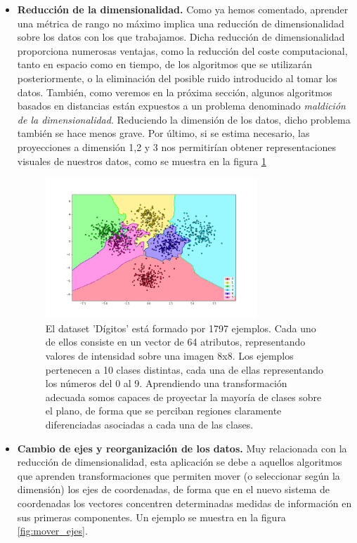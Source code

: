\documentclass{book}
\begin{document}
\begin{itemize}
	\item \textbf{Reducción de la dimensionalidad.} Como ya hemos comentado, aprender una métrica de rango no máximo implica una reducción de dimensionalidad sobre los datos con los que trabajamos. Dicha reducción de dimensionalidad proporciona numerosas ventajas, como la reducción del coste computacional, tanto en espacio como en tiempo, de los algoritmos que se utilizarán posteriormente, o la eliminación del posible ruido introducido al tomar los datos. También, como veremos en la próxima sección, algunos algoritmos basados en distancias están expuestos a un problema denominado \emph{maldición de la dimensionalidad}. Reduciendo la dimensión de los datos, dicho problema también se hace menos grave. Por último, si se estima necesario, las proyecciones a dimensión 1,2 y 3 nos permitirían obtener representaciones visuales de nuestros datos, como se muestra en la figura \ref{fig:reduc_dim}

	\begin{figure}[h]
	\centering
	\includegraphics[width=0.75\textwidth]{./images/ex_red_dim.png}
	\caption{El dataset 'Dígitos' está formado por 1797 ejemplos. Cada uno de ellos consiste en un vector de 64 atributos, representando valores de intensidad sobre una imagen 8x8. Los ejemplos pertenecen a 10 clases distintas, cada una de ellas representando los números del 0 al 9. Aprendiendo una transformación adecuada somos capaces de proyectar la mayoría de clases sobre el plano, de forma que se perciban regiones claramente diferenciadas asociadas a cada una de las clases.} \label{fig:reduc_dim}
	\end{figure}


	\item \textbf{Cambio de ejes y reorganización de los datos.} Muy relacionada con la reducción de dimensionalidad, esta aplicación se debe a aquellos algoritmos que aprenden transformaciones que permiten mover (o seleccionar según la dimensión) los ejes de coordenadas, de forma que en el nuevo sistema de coordenadas los vectores concentren determinadas medidas de información en sus primeras componentes. Un ejemplo se muestra en la figura \ref{fig:mover_ejes}.


\end{itemize}
\end{document}
